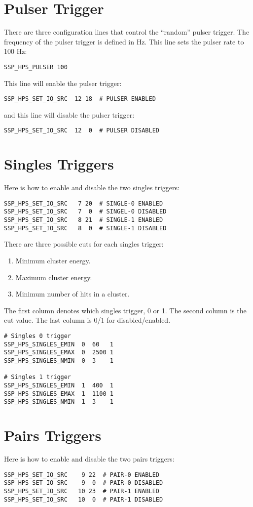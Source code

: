 \documentclass[amsmath,amssymb,notitlepage,11pt]{revtex4-1}
\begin{document}
\section{Pulser Trigger}
There are three configuration lines that control the ``random'' pulser trigger.  The frequency of the pulser trigger is defined in Hz.  This line sets the pulser rate to 100 Hz:
\begin{verbatim}
SSP_HPS_PULSER 100
\end{verbatim}
This line will enable the pulser trigger:
\begin{verbatim}
SSP_HPS_SET_IO_SRC  12 18  # PULSER ENABLED
\end{verbatim}
and this line will disable the pulser trigger:
\begin{verbatim}
SSP_HPS_SET_IO_SRC  12  0  # PULSER DISABLED
\end{verbatim}

\section{Singles Triggers}
Here is how to enable and disable the two singles triggers:
\begin{verbatim}
SSP_HPS_SET_IO_SRC   7 20  # SINGLE-0 ENABLED
SSP_HPS_SET_IO_SRC   7  0  # SINGEL-0 DISABLED
SSP_HPS_SET_IO_SRC   8 21  # SINGLE-1 ENABLED
SSP_HPS_SET_IO_SRC   8  0  # SINGLE-1 DISABLED
\end{verbatim}
There are three possible cuts for each singles trigger:
\begin{enumerate}
  \item Minimum cluster energy.
  \item Maximum cluster energy.
  \item Minimum number of hits in a cluster.
\end{enumerate}
The first column denotes which singles trigger, 0 or 1.
The second column is the cut value.
The last column is 0/1 for disabled/enabled.
\begin{verbatim}
# Singles 0 trigger
SSP_HPS_SINGLES_EMIN  0  60   1
SSP_HPS_SINGLES_EMAX  0  2500 1
SSP_HPS_SINGLES_NMIN  0  3    1

# Singles 1 trigger
SSP_HPS_SINGLES_EMIN  1  400  1
SSP_HPS_SINGLES_EMAX  1  1100 1
SSP_HPS_SINGLES_NMIN  1  3    1
\end{verbatim}

\section{Pairs Triggers}
Here is how to enable and disable the two pairs triggers:
\begin{verbatim}
SSP_HPS_SET_IO_SRC    9 22  # PAIR-0 ENABLED
SSP_HPS_SET_IO_SRC    9  0  # PAIR-0 DISABLED
SSP_HPS_SET_IO_SRC   10 23  # PAIR-1 ENABLED
SSP_HPS_SET_IO_SRC   10  0  # PAIR-1 DISABLED
\end{verbatim}
\end{document}
